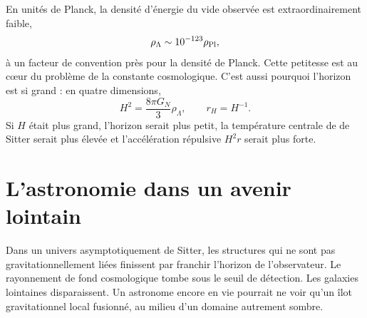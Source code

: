 En unités de Planck, la densité d’énergie du vide observée est extraordinairement faible,
\begin{equation}
\rho_\Lambda\sim10^{-123}\rho_{\rm Pl},
\label{eq:l09-planck-smallness}
\end{equation}
à un facteur de convention près pour la densité de Planck. Cette petitesse est au cœur du problème de la constante cosmologique. C’est aussi pourquoi l’horizon est si grand : en quatre dimensions,
\begin{equation}
H^2=\frac{8\pi G_N}{3}\rho_\Lambda,
\qquad
r_H=H^{-1}.
\end{equation}
Si \(H\) était plus grand, l’horizon serait plus petit, la température centrale de de Sitter serait plus élevée et l’accélération répulsive \(H^2r\) serait plus forte.

\begin{classroomqa}
\end{classroomqa}

\begin{classroomqa}
\end{classroomqa}

\section{L’astronomie dans un avenir lointain}

Dans un univers asymptotiquement de Sitter, les structures qui ne sont pas gravitationnellement liées finissent par franchir l’horizon de l’observateur. Le rayonnement de fond cosmologique tombe sous le seuil de détection. Les galaxies lointaines disparaissent. Un astronome encore en vie pourrait ne voir qu’un îlot gravitationnel local fusionné, au milieu d’un domaine autrement sombre.


